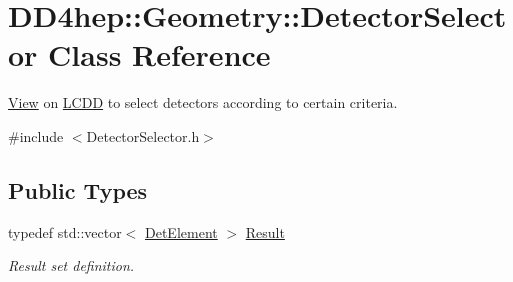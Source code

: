 \hypertarget{class_d_d4hep_1_1_geometry_1_1_detector_selector}{}\section{D\+D4hep\+:\+:Geometry\+:\+:Detector\+Selector Class Reference}
\label{class_d_d4hep_1_1_geometry_1_1_detector_selector}


\hyperlink{class_d_d4hep_1_1_view}{View} on \hyperlink{class_d_d4hep_1_1_geometry_1_1_l_c_d_d}{L\+C\+DD} to select detectors according to certain criteria.  




{\ttfamily \#include $<$Detector\+Selector.\+h$>$}

\subsection*{Public Types}
\begin{DoxyCompactItemize}
\item 
typedef std\+::vector$<$ \hyperlink{class_d_d4hep_1_1_geometry_1_1_det_element}{Det\+Element} $>$ \hyperlink{class_d_d4hep_1_1_geometry_1_1_detector_selector_a6ce0dfe8c83f5d36138244218f260ed1}{Result}
\begin{DoxyCompactList}\small\item\em Result set definition. \end{DoxyCompactList}\end{DoxyCompactItemize}
